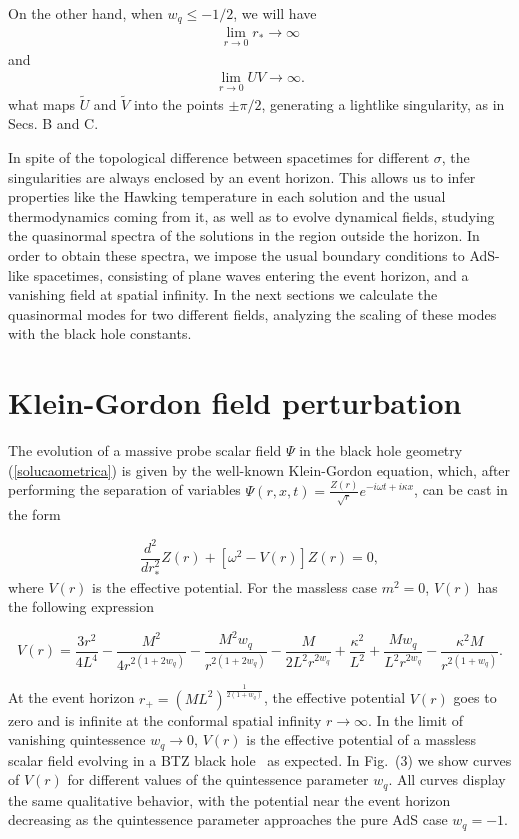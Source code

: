 \documentclass[preprint]{revtex4-1}
\def\be{\begin{eqnarray}}
\def\ee{\end{eqnarray}}
\begin{document}
On the other hand, when $w_q \leq -1/2$, we will have
\be
\label{gt2}
\lim_{r\rightarrow 0} r_* \rightarrow \infty
\ee
and
\be
\label{gt2}
\lim_{r\rightarrow 0} UV \rightarrow \infty.
\ee 
what maps $\tilde{U}$ and $\tilde{V}$  into the points $\pm \pi /2$, generating a lightlike singularity, as in Secs. B and C. 

In spite of the topological difference between spacetimes for different $\sigma$, the singularities are always enclosed by an event horizon. This allows us to infer properties like the Hawking temperature in each solution and the usual thermodynamics coming from it, as well as to evolve dynamical fields, studying the quasinormal spectra of the solutions in the region outside the horizon. In order to obtain these spectra, we impose the usual boundary conditions to AdS-like spacetimes, consisting of plane waves entering the event horizon, and a vanishing field at spatial infinity. In the next sections we calculate the quasinormal modes for two different fields, analyzing the scaling of these modes with the black hole constants.  

\section{Klein-Gordon field perturbation}\label{kg}


The evolution of a massive probe scalar field $\Psi$ in the black hole geometry (\ref{solucaometrica}) is given by the well-known Klein-Gordon equation, which, after performing the separation of variables $\Psi(r,x,t)=\frac{Z(r)}{\sqrt{r}}e^{-i\omega t +i\kappa x}$, can be cast in the form

\begin{equation}\label{kg1}
\frac{d^{2}}{dr_{*}^{2}}Z(r)+\left[\omega^{2}-V(r)\right]Z(r)=0,
\end{equation}
where $V(r)$ is the effective potential. For the massless case $m^{2}=0$, $V(r)$ has the following expression

\begin{equation}\label{potencial_escalar}
V(r)=\frac{3r^{2}}{4L^{4}}-\frac{M^{2}}{4 r^{2(1+2w_{q})}}-\frac{M^{2}w_{q}}{r^{2(1+2w_{q})}}-\frac{M}{2L^{2}r^{2 w_{q}}}+\frac{\kappa^{2}}{L^{2}}+\frac{M w_{{q}}}{L^{2}r^{2 w_{{q}}}}-\frac{\kappa^{2}M}{r^{2(1+w_{q})}}.
\end{equation}

At the event horizon $r_{+}=(ML^2)^{\frac{1}{2(1+w_{q})}}$, the effective potential $V(r)$ goes to zero and is infinite at the conformal spatial infinity $r\rightarrow \infty$. In the limit of vanishing quintessence $w_{q}\rightarrow 0$, $V(r)$ is the effective potential of a massless scalar field evolving in a BTZ black hole~\cite{Cardoso:2001hn} as expected. In Fig.~(3) we show curves of $V(r)$ for different values of the quintessence parameter $w_{q}$. All curves display the same qualitative behavior, with the potential near the event horizon decreasing as the quintessence parameter approaches the pure AdS case $w_{q}=-1$. 
\end{document}
